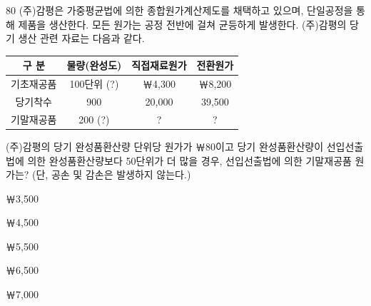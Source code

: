 \begin{question}{80}
(주)감평은 가중평균법에 의한 종합원가계산제도를 채택하고 있으며, 단일공정을 통해 제품을 생산한다. 모든 원가는 공정 전반에 걸쳐 균등하게 발생한다. (주)감평의 당기 생산 관련 자료는 다음과 같다.
\par{\small\centering\begin{tabular}{|c|c|c|c|}\hline
구 분 & 물량(완성도) & 직접재료원가 & 전환원가 \\ \hline
기초재공품 & 100단위 (?) & ￦4,300 & ￦8,200 \\ \hline
당기착수 & 900 & 20,000 & 39,500 \\ \hline
기말재공품 & 200 (?) & ? & ? \\ \hline
\end{tabular}\par}
(주)감평의 당기 완성품환산량 단위당 원가가 ￦80이고 당기 완성품환산량이 선입선출법에 의한 완성품환산량보다 50단위가 더 많을 경우, 선입선출법에 의한 기말재공품 원가는? (단, 공손 및 감손은 발생하지 않는다.)
\begin{choices}
  \item ￦3,500
  \item ￦4,500
  \item ￦5,500
  \item ￦6,500
  \item ￦7,000
\end{choices}
\end{question}
